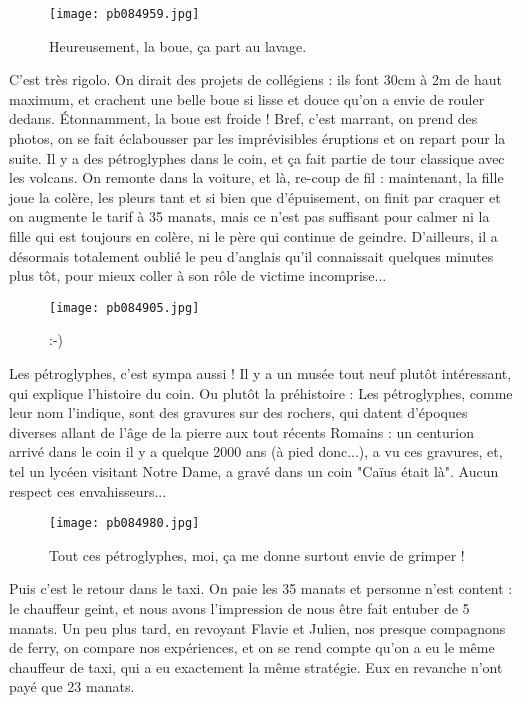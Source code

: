 \documentclass{book}
\begin{document}
\begin{figure}[h]
\centering
\texttt{[image: pb084959.jpg]}
\caption*{Heureusement, la boue, ça part au lavage.}
\end{figure}

C'est très rigolo. On dirait des projets de collégiens : ils font 30cm à 2m de haut maximum, et crachent une belle boue si lisse et douce qu'on a envie de rouler dedans. Étonnamment, la boue est froide ! Bref, c'est marrant, on prend des photos, on se fait éclabousser par les imprévisibles éruptions et on repart pour la suite. Il y a des pétroglyphes dans le coin, et ça fait partie de tour classique avec les volcans. On remonte dans la voiture, et là, re-coup de fil : maintenant, la fille joue la colère, les pleurs tant et si bien que d'épuisement, on finit par craquer et on augmente le tarif à 35 manats, mais ce n'est pas suffisant pour calmer ni la fille qui est toujours en colère, ni le père qui continue de geindre. D'ailleurs, il a désormais totalement oublié le peu d'anglais qu'il connaissait quelques minutes plus tôt, pour mieux coller à son rôle de victime incomprise...


\begin{figure}[h]
\centering
\texttt{[image: pb084905.jpg]}
\caption*{:-)}
\end{figure}

Les pétroglyphes, c'est sympa aussi ! Il y a un musée tout neuf plutôt intéressant, qui explique l'histoire du coin. Ou plutôt la préhistoire : Les pétroglyphes, comme leur nom l'indique, sont des gravures sur des rochers, qui datent d'époques diverses allant de l'âge de la pierre aux tout récents Romains : un centurion arrivé dans le coin il y a quelque 2000 ans (à pied donc...), a vu ces gravures, et, tel un lycéen visitant Notre Dame, a gravé dans un coin "Caïus était là". Aucun respect ces envahisseurs...


\begin{figure}[h]
\centering
\texttt{[image: pb084980.jpg]}
\caption*{Tout ces pétroglyphes, moi, ça me donne surtout envie de grimper !}
\end{figure}

Puis c'est le retour dans le taxi. On paie les 35 manats et personne n'est content : le chauffeur geint, et nous avons l'impression de nous être fait entuber de 5 manats. Un peu plus tard, en revoyant Flavie et Julien, nos presque compagnons de ferry, on compare nos expériences, et on se rend compte qu'on a eu le même chauffeur de taxi, qui a eu exactement la même stratégie. Eux en revanche n'ont payé que 23 manats.
\end{document}
